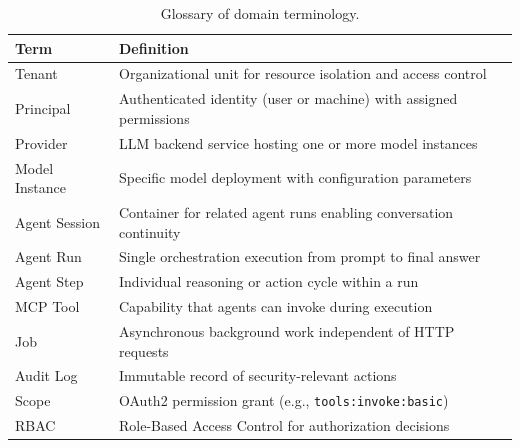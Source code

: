 \begin{table}[htbp]
    \centering
    \caption{Glossary of domain terminology.}
    \label{tab:domain-glossary}
    \small
    \begin{tabularx}{\textwidth}{lX}
        \toprule
        \textbf{Term} & \textbf{Definition} \\
        \midrule
        Tenant & Organizational unit for resource isolation and access control \\
        Principal & Authenticated identity (user or machine) with assigned permissions \\
        Provider & LLM backend service hosting one or more model instances \\
        Model Instance & Specific model deployment with configuration parameters \\
        Agent Session & Container for related agent runs enabling conversation continuity \\
        Agent Run & Single orchestration execution from prompt to final answer \\
        Agent Step & Individual reasoning or action cycle within a run \\
        MCP Tool & Capability that agents can invoke during execution \\
        Job & Asynchronous background work independent of HTTP requests \\
        Audit Log & Immutable record of security-relevant actions \\
        Scope & OAuth2 permission grant (e.g., \texttt{tools:invoke:basic}) \\
        RBAC & Role-Based Access Control for authorization decisions \\
        \bottomrule
    \end{tabularx}
\end{table}
